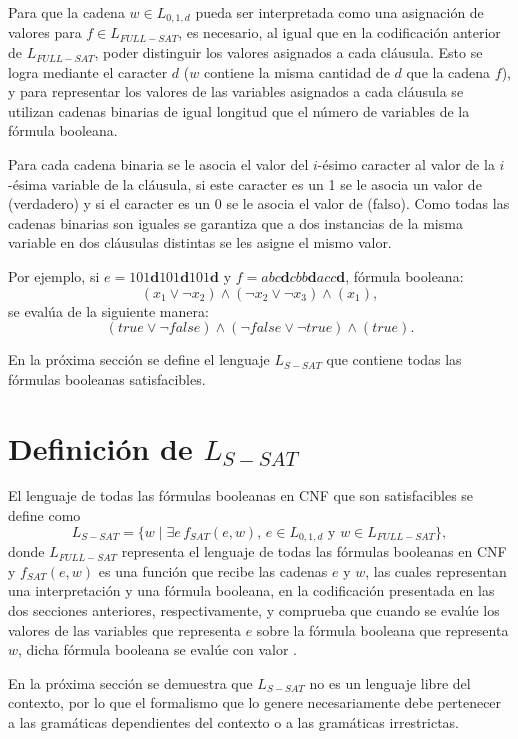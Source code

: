 Para que la cadena $w\in L_{0,1,d}$ pueda ser interpretada como una asignación de valores para $f\in L_{FULL-SAT}$, 
es necesario, al igual que en la codificación anterior de $L_{FULL-SAT}$, poder distinguir los valores asignados 
a cada cláusula. Esto se logra mediante el caracter $d$ ($w$ contiene la misma cantidad de $d$ que la cadena $f$), y para representar los valores de las variables asignados a cada cláusula se utilizan 
cadenas binarias de igual longitud que el número de variables de la fórmula booleana.

Para cada cadena binaria se le asocia el valor del $i$-ésimo caracter al valor de la $i$-ésima variable de la 
cláusula, si este caracter es un 1 se le asocia un valor de \true{} (verdadero) y si el caracter es un 0 
se le asocia el valor de \false{} (falso). Como todas las cadenas binarias son iguales
se garantiza que a dos instancias de la misma variable en dos cláusulas distintas se les asigne el 
mismo valor.


Por ejemplo, si $e=101\mathbf{d}101\mathbf{d}101\mathbf{d}$ y $f=abc\mathbf{d}cbb\mathbf{d}acc\mathbf{d}$, fórmula booleana:
$$(x_1\vee\neg x_2)\wedge (\neg x_2 \vee \neg x_3)\wedge (x_1),$$
se evalúa de la siguiente manera:
$$(true\vee\neg false)\wedge (\neg false \vee \neg true)\wedge (true).$$

En la próxima sección se define el lenguaje $L_{S-SAT}$ que contiene todas las fórmulas booleanas satisfacibles.

\section{Definición de $L_{S-SAT}$}

El lenguaje de todas las fórmulas booleanas en CNF que son satisfacibles se define como $$L_{S-SAT}=\{w \mid \exists e\,f_{SAT}(e,w),\,e\in L_{0,1,d}\text{ y }w \in L_{FULL-SAT} \},$$ donde $L_{FULL-SAT}$ representa el lenguaje de todas las fórmulas booleanas en CNF y $f_{SAT}(e,w)$
es una función que recibe las cadenas $e$ y $w$, las cuales representan una interpretación y una fórmula booleana, en la codificación
presentada en las dos secciones anteriores, respectivamente, y comprueba que cuando se evalúe los valores de las variables
que representa $e$ sobre la fórmula booleana que representa $w$, dicha fórmula booleana se evalúe con valor \true{}.


En la próxima sección se demuestra que $L_{S-SAT}$ no es un lenguaje libre del contexto, por lo que el formalismo que lo
genere necesariamente debe pertenecer a las gramáticas dependientes del contexto o a las gramáticas irrestrictas.

